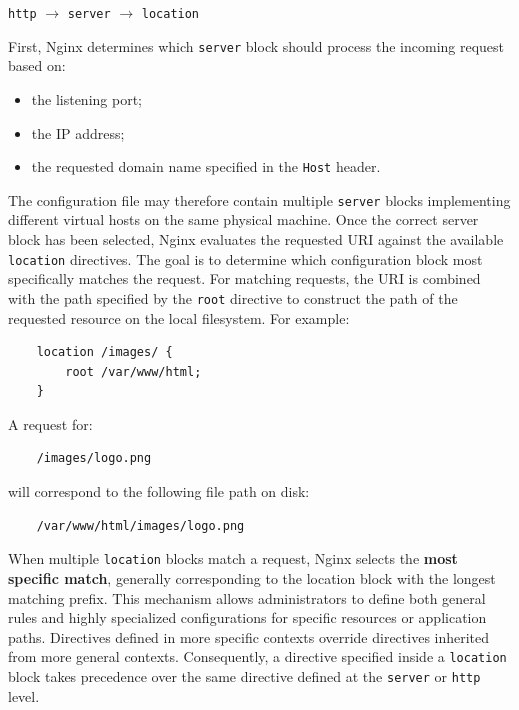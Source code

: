 \documentclass{scrbook}
\begin{document}
	\begin{center}
		\texttt{http} $\rightarrow$ \texttt{server} $\rightarrow$ \texttt{location}
	\end{center}
	
	\newpage
	First, Nginx determines which \texttt{server} block should process the incoming request based on:
	\begin{itemize}
		\item the listening port;
		\item the IP address;
		\item the requested domain name specified in the \texttt{Host} header.
	\end{itemize}
	
	The configuration file may therefore contain multiple \texttt{server} blocks implementing different virtual hosts on the same physical machine. Once the correct server block has been selected, Nginx evaluates the requested URI against the available \texttt{location} directives. The goal is to determine which configuration block most specifically matches the request. For matching requests, the URI is combined with the path specified by the \texttt{root} directive to construct the path of the requested resource on the local filesystem. For example:
	
	\begin{lstlisting}
	location /images/ {
		root /var/www/html;
	}
	\end{lstlisting}
	
	A request for:
	
	\begin{lstlisting}
	/images/logo.png
	\end{lstlisting}
	
	will correspond to the following file path on disk:
	
	\begin{lstlisting}
	/var/www/html/images/logo.png
	\end{lstlisting}
	
	When multiple \texttt{location} blocks match a request, Nginx selects the \textbf{most specific match}, generally corresponding to the location block with the longest matching prefix. This mechanism allows administrators to define both general rules and highly specialized configurations for specific resources or application paths. Directives defined in more specific contexts override directives inherited from more general contexts. Consequently, a directive specified inside a \texttt{location} block takes precedence over the same directive defined at the \texttt{server} or \texttt{http} level.\\
	
\end{document}
